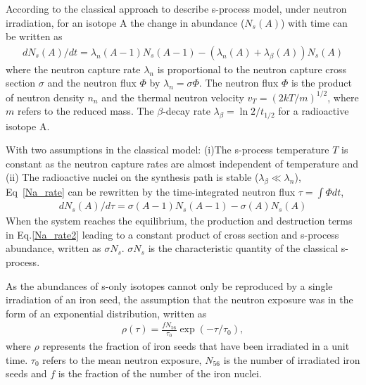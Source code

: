 

According to the classical approach to describe s-process model\citep{Kappeler1989}\citep{CLAYTON1961}, under neutron irradiation, for an  isotope A the change in abundance ($N_s(A)$) with time  can be written as
 \begin{equation}
    \label{Na_rate}
    \begin{aligned}
        dN_s(A)/dt = \lambda_n(A-1)N_s(A-1) - (\lambda_n(A) + \lambda_{\beta}(A)) N_s(A)
    \end{aligned}
\end{equation}
where the neutron capture rate $\lambda_n$ is proportional to the neutron capture cross section $\sigma$ and the neutron flux $\Phi$ by $\lambda_n = \sigma \Phi$. The neutron flux $\Phi$ is the product of neutron density $n_n$ and the thermal neutron velocity $v_T = (2kT/m)^{1/2}$, where $m$ refers to the reduced mass. The $\beta$-decay rate $\lambda_\beta=\ln 2/t_{1/2}$ for a radioactive isotope A.

With two assumptions in the classical model: (i)The s-process temperature $T$ is constant as the neutron capture rates are almost independent of  temperature and (ii) The radioactive nuclei on the synthesis path is stable ($\lambda_\beta \ll \lambda_n$), Eq~\ref{Na_rate} can be rewritten by the time-integrated neutron flux $\tau = \int \Phi dt$,
 \begin{equation}
    \label{Na_rate2}
    \begin{aligned}
        dN_s(A)/d\tau = \sigma(A-1)N_s(A-1)-\sigma(A)N_s(A)
    \end{aligned}
\end{equation}
When the system reaches the equilibrium, the production and destruction terms in Eq.\ref{Na_rate2} leading to a constant product of cross section and s-process abundance, written as $\sigma N_s$. $\sigma N_s$ is the characteristic quantity of the classical s-process.

As the abundances of s-only isotopes cannot only be reproduced by a single irradiation of an iron seed\citep{CLAYTON1961}, the assumption that the neutron exposure was in the form of   an exponential distribution\citep{SeegerP1965}, written as
 \begin{equation}
    \label{rho}
    \begin{aligned}
        \rho(\tau) = \frac{f N_{56}}{\tau_0} \exp(-\tau/\tau_0),
    \end{aligned}
\end{equation}
where $\rho$ represents the fraction of iron seeds that have been irradiated in a unit time. $\tau_0$ refers to the mean neutron exposure,  $N_{56}$ is  the number of irradiated iron seeds and $f$ is the fraction of the number of the iron nuclei.

